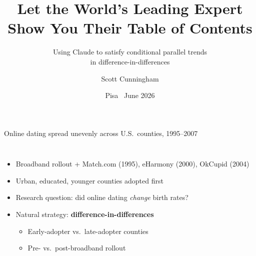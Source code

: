 \documentclass[aspectratio=169,12pt]{beamer}
\title{Let the World's Leading Expert\\
       Show You Their Table of Contents}
\subtitle{Using Claude to satisfy conditional parallel trends\\
          in difference-in-differences}
\author{Scott Cunningham}
\institute{Baylor University \textperiodcentered\;
           Sant'Anna Workshop on Causal Inference}
\date{Pisa \textperiodcentered\ June 2026}
\begin{document}
\begin{frame}[plain]
  \titlepage
\end{frame}


\begin{frame}{Online dating spread unevenly across U.S.\ counties, 1995--2007}
\begin{columns}[c]
  \begin{itemize}
    \item Broadband rollout + Match.com (1995), eHarmony (2000), OkCupid (2004)
    \item Urban, educated, younger counties adopted first
    \item Research question: did online dating \emph{change} birth rates?
    \vspace{0.6em}
    \item Natural strategy: \textbf{difference-in-differences}
    \begin{itemize}
      \item Early-adopter vs.\ late-adopter counties
      \item Pre- vs.\ post-broadband rollout
    \end{itemize}
  \end{itemize}
\end{columns}
\end{frame}
\end{document}
